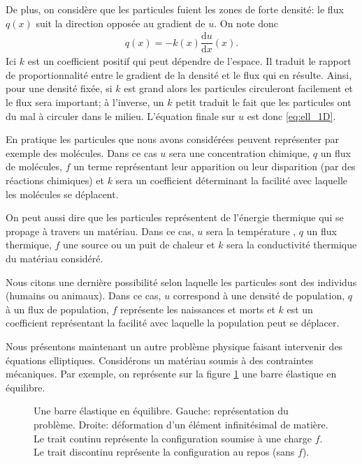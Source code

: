 \documentclass[12pt,a4paper,twoside]{article}
\begin{document}
De plus, on consid\`ere que les particules fuient les zones de forte densit\'e:
le flux $q(x)$ suit la direction oppos\'ee au gradient de $u$.
On note donc 
\begin{align}
  \label{eq:def_flux}
  q(x) = - k(x) \dfrac{\mathrm{d} u}{\mathrm{d} x}(x) . 
\end{align}
Ici $k$ est un coefficient positif qui peut d\'ependre de l'espace.
Il traduit le rapport de proportionnalit\'e entre le gradient de la densit\'e
et le flux qui en r\'esulte. Ainsi, pour une densit\'e fix\'ee,
si $k$ est grand alors les particules circuleront facilement et le flux sera important;
\`a l'inverse, un $k$ petit traduit le fait que les particules ont du mal \`a circuler dans
le milieu.
L'\'equation finale sur $u$ est donc \eqref{eq:ell_1D}.



En pratique les particules que nous avons consid\'er\'ees peuvent 
repr\'esenter par exemple des mol\'ecules.
Dans ce cas $u$ sera une concentration chimique, $q$ un flux de mol\'ecules, 
$f$ un terme repr\'esentant leur apparition ou leur disparition
(par des r\'eactions chimiques) et
$k$ sera un coefficient d\'eterminant la facilit\'e avec laquelle
les mol\'ecules se d\'eplacent.

On peut aussi dire que les particules repr\'esentent de l'\'energie thermique
qui se propage \`a travers un mat\'eriau.
Dans ce cas, $u$ sera la temp\'erature , $q$ un flux thermique, $f$ une source
ou un puit de chaleur et $k$ sera la conductivit\'e thermique du mat\'eriau consid\'er\'e.

Nous citons une derni\`ere possibilit\'e selon laquelle les particules sont des
individus (humains ou animaux).
Dans ce cas, $u$ correspond \`a une densit\'e de population,
$q$ \`a un flux de population, $f$ repr\'esente les naissances et morts
et $k$ est un coefficient repr\'esentant la
facilit\'e avec laquelle la population peut se d\'eplacer. 


Nous pr\'esentons maintenant
un autre probl\`eme physique faisant intervenir des \'equations elliptiques.
Consid\'erons un mat\'eriau 
soumis \`a des contraintes m\'ecaniques.
Par exemple, on repr\'esente sur la figure \ref{fig:barre} une barre \'elastique
en \'equilibre.


\begin{figure}
\begin{tikzpicture}[scale = 1.5]
  
\end{tikzpicture}
\begin{tikzpicture}[scale = 2]
  
\end{tikzpicture}
\caption{Une barre \'elastique en \'equilibre. Gauche: repr\'esentation du probl\`eme.
  Droite: d\'eformation d'un \'el\'ement infinit\'esimal de mati\`ere.
  Le trait continu repr\'esente la configuration soumise \`a une charge $f$.
  Le trait discontinu repr\'esente la configuration au repos (sans $f$).}
\label{fig:barre}
\end{figure}
\end{document}
